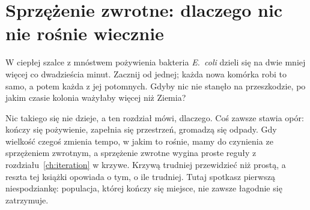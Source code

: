 
\chapter{Sprzężenie zwrotne: dlaczego nic nie rośnie wiecznie}
\label{ch:feedback}

\noindent
W ciepłej szalce z mnóstwem pożywienia bakteria \emph{E.~coli} dzieli się na
dwie mniej więcej co dwadzieścia minut. Zacznij od jednej; każda nowa
komórka robi to samo, a potem każda z jej potomnych. Gdyby nic nie stanęło na
przeszkodzie, po jakim czasie kolonia ważyłaby więcej niż Ziemia?

Nic takiego się nie dzieje, a ten rozdział mówi, dlaczego. Coś zawsze stawia
opór: kończy się pożywienie, zapełnia się przestrzeń, gromadzą się odpady.
Gdy wielkość czegoś zmienia tempo, w jakim to rośnie, mamy do czynienia ze
sprzężeniem zwrotnym, a sprzężenie zwrotne wygina proste reguły z
rozdziału~\ref{ch:iteration} w krzywe. Krzywą trudniej przewidzieć niż
prostą, a reszta tej książki opowiada o tym, o ile trudniej. Tutaj spotkasz
pierwszą niespodziankę: populacja, której kończy się miejsce, nie zawsze
łagodnie się zatrzymuje.

\begin{outcomes}
\end{outcomes}

